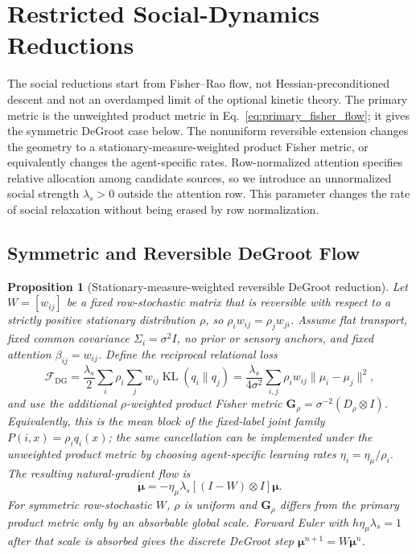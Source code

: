 \documentclass[12pt]{article}
\newcommand{\KL}{\operatorname{KL}}
\newtheorem{proposition}[theorem]{Proposition}
\begin{document}
\section{Restricted Social-Dynamics Reductions}
\label{sec:classical_limits}

The social reductions start from Fisher--Rao flow, not Hessian-preconditioned descent and not an overdamped limit of the optional kinetic theory.  The primary metric is the unweighted product metric in Eq.~\eqref{eq:primary_fisher_flow}; it gives the symmetric DeGroot case below.  The nonuniform reversible extension changes the geometry to a stationary-measure-weighted product Fisher metric, or equivalently changes the agent-specific rates.  Row-normalized attention specifies relative allocation among candidate sources, so we introduce an unnormalized social strength $\lambda_s>0$ outside the attention row.  This parameter changes the rate of social relaxation without being erased by row normalization.

\subsection{Symmetric and Reversible DeGroot Flow}

\begin{proposition}[Stationary-measure-weighted reversible DeGroot reduction]
\label{prop:reversible_degroot}
Let $W=[w_{ij}]$ be a fixed row-stochastic matrix that is reversible with respect to a strictly positive stationary distribution $\rho$, so $\rho_iw_{ij}=\rho_jw_{ji}$.  Assume flat transport, fixed common covariance $\Sigma_i=\sigma^2I$, no prior or sensory anchors, and fixed attention $\beta_{ij}=w_{ij}$.  Define the reciprocal relational loss
\begin{equation}
\mathcal F_{\mathrm{DG}}
=\frac{\lambda_s}{2}\sum_i\rho_i\sum_jw_{ij}\KL(q_i\|q_j)
=\frac{\lambda_s}{4\sigma^2}
\sum_{i,j}\rho_iw_{ij}\|\mu_i-\mu_j\|^2,
\label{eq:reversible_dirichlet_energy}
\end{equation}
and use the additional $\rho$-weighted product Fisher metric
$\mathbf G_\rho=\sigma^{-2}(D_\rho\otimes I)$.  Equivalently, this is the mean block of the fixed-label joint family $P(i,x)=\rho_iq_i(x)$; the same cancellation can be implemented under the unweighted product metric by choosing agent-specific learning rates $\eta_i=\eta_\mu/\rho_i$.  The resulting natural-gradient flow is
\begin{equation}
\boxed{\dot{\boldsymbol\mu}
=-\eta_\mu\lambda_s[(I-W)\otimes I]\boldsymbol\mu.}
\label{eq:reversible_degroot_flow}
\end{equation}
For symmetric row-stochastic $W$, $\rho$ is uniform and $\mathbf G_\rho$ differs from the primary product metric only by an absorbable global scale.  Forward Euler with $h\eta_\mu\lambda_s=1$ after that scale is absorbed gives the discrete DeGroot step $\boldsymbol\mu^{n+1}=W\boldsymbol\mu^n$.
\end{proposition}
\end{document}
